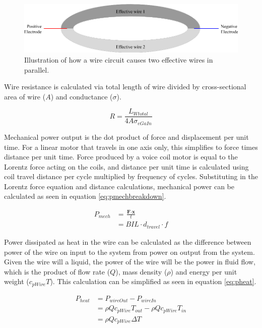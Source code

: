 \documentclass[a4paper,12pt]{article}
\begin{document}
\begin{figure}[h!]
    \centering
    \includegraphics[scale=0.4]{parallelwire.png}
    \caption{Illustration of how a wire circuit causes two effective wires in parallel.}
    \label{fg:parallelwire}
\end{figure}

Wire resistance is calculated via total length of wire divided by cross-sectional area of wire ($A$) and conductance ($\sigma$).

\begin{equation}\label{eq:resistance}
    R=\frac{L_{Wtotal}}{4A\sigma_{eGaIn}}
\end{equation}

Mechanical power output is the dot product of force and displacement per unit time. For a linear motor that travels in one axis only, this simplifies to force times distance per unit time. Force produced by a voice coil motor is equal to the Lorentz force acting on the coils, and distance per unit time is calculated using coil travel distance per cycle multiplied by frequency of cycles. Substituting in the Lorentz force equation and distance calculations, mechanical power can be calculated as seen in equation \ref{eq:pmechbreakdown}.

\begin{equation}\label{eq:pmechbreakdown}
    \begin{split}
   		P_{mech} & = \frac{\textbf{F} \cdot \textbf{x}}{t} \\
    	& = BIL\cdot d_{travel} \cdot f
    \end{split}
\end{equation}

Power dissipated as heat in the wire can be calculated as the difference between power of the wire on input to the system from power on output from the system. Given the wire will a liquid, the power of the wire will be the power in fluid flow, which is the product of flow rate ($Q$), mass density ($\rho$) and energy per unit weight ($c_{pWire}T$). This calculation can be simplified as seen in equation \ref{eq:pheat}.

\begin{equation}\label{eq:pheat}
    \begin{split}
    	P_{heat} & = P_{wireOut} - P_{wireIn} \\
		& = \rho Q c_{pWire} T_{out} - \rho Q c_{pWire} T_{in} \\
		& = \rho Q c_{pWire} \Delta T
    \end{split}
\end{equation}
\end{document}

